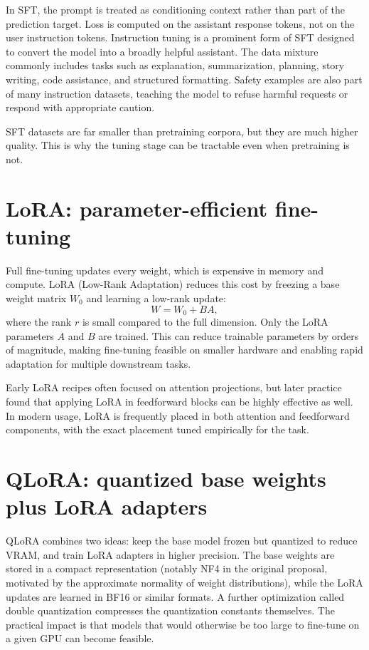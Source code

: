 In SFT, the prompt is treated as conditioning context rather than part of the prediction target. Loss is computed on the assistant response tokens, not on the user instruction tokens. Instruction tuning is a prominent form of SFT designed to convert the model into a broadly helpful assistant. The data mixture commonly includes tasks such as explanation, summarization, planning, story writing, code assistance, and structured formatting. Safety examples are also part of many instruction datasets, teaching the model to refuse harmful requests or respond with appropriate caution.

SFT datasets are far smaller than pretraining corpora, but they are much higher quality. This is why the tuning stage can be tractable even when pretraining is not.

\section{LoRA: parameter-efficient fine-tuning}
Full fine-tuning updates every weight, which is expensive in memory and compute. LoRA (Low-Rank Adaptation) reduces this cost by freezing a base weight matrix \(W_0\) and learning a low-rank update:
\[
W = W_0 + BA,
\]
where the rank \(r\) is small compared to the full dimension. Only the LoRA parameters \(A\) and \(B\) are trained. This can reduce trainable parameters by orders of magnitude, making fine-tuning feasible on smaller hardware and enabling rapid adaptation for multiple downstream tasks.

Early LoRA recipes often focused on attention projections, but later practice found that applying LoRA in feedforward blocks can be highly effective as well. In modern usage, LoRA is frequently placed in both attention and feedforward components, with the exact placement tuned empirically for the task.

\section{QLoRA: quantized base weights plus LoRA adapters}
QLoRA combines two ideas: keep the base model frozen but quantized to reduce VRAM, and train LoRA adapters in higher precision. The base weights are stored in a compact representation (notably NF4 in the original proposal, motivated by the approximate normality of weight distributions), while the LoRA updates are learned in BF16 or similar formats. A further optimization called double quantization compresses the quantization constants themselves. The practical impact is that models that would otherwise be too large to fine-tune on a given GPU can become feasible.

